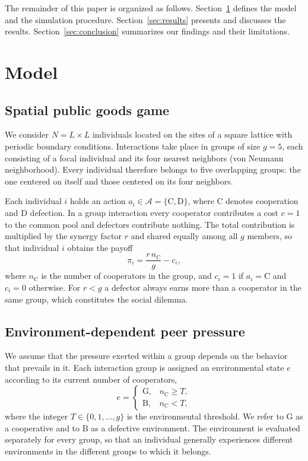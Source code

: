 \documentclass[%
  aip,cha,
  amsmath,amssymb,
  reprint,
  article-title,
]{revtex4-2}
\begin{document}
The remainder of this paper is organized as follows. Section~\ref{sec:model} defines the model and the simulation procedure. Section~\ref{sec:results} presents and discusses the results. Section~\ref{sec:conclusion} summarizes our findings and their limitations.


\section{Model}\label{sec:model}

\subsection{Spatial public goods game}\label{sec:pgg}

We consider $N=L\times L$ individuals located on the sites of a square lattice with periodic boundary conditions. Interactions take place in groups of size $g=5$, each consisting of a focal individual and its four nearest neighbors (von Neumann neighborhood). Every individual therefore belongs to five overlapping groups: the one centered on itself and those centered on its four neighbors.

Each individual $i$ holds an action $a_i\in\mathcal{A}=\{\mathrm{C},\mathrm{D}\}$, where $\mathrm{C}$ denotes cooperation and $\mathrm{D}$ defection. In a group interaction every cooperator contributes a cost $c=1$ to the common pool and defectors contribute nothing. The total contribution is multiplied by the synergy factor $r$ and shared equally among all $g$ members, so that individual $i$ obtains the payoff
\begin{equation}
\pi_i=\frac{r\,n_{\mathrm{C}}}{g}-c_i,
\label{eq:payoff}
\end{equation}
where $n_{\mathrm{C}}$ is the number of cooperators in the group, and $c_i=1$ if $a_i=\mathrm{C}$ and $c_i=0$ otherwise. For $r<g$ a defector always earns more than a cooperator in the same group, which constitutes the social dilemma.

\subsection{Environment-dependent peer pressure}\label{sec:pressure}

We assume that the pressure exerted within a group depends on the behavior that prevails in it. Each interaction group is assigned an environmental state $e$ according to its current number of cooperators,
\begin{equation}
e=
\begin{cases}
\mathrm{G}, & n_{\mathrm{C}}\geq T,\\
\mathrm{B}, & n_{\mathrm{C}}<T,
\end{cases}
\label{eq:environment}
\end{equation}
where the integer $T\in\{0,1,\dots,g\}$ is the environmental threshold. We refer to $\mathrm{G}$ as a cooperative and to $\mathrm{B}$ as a defective environment. The environment is evaluated separately for every group, so that an individual generally experiences different environments in the different groups to which it belongs.
\end{document}
